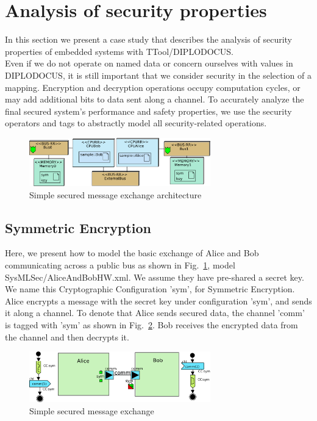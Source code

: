 \documentclass{llncs}
\begin{document}
\section{Analysis of security properties}
\label{sec:Security}
%
In this section we present a case study that describes the analysis of security properties of embedded systems with
TTool/DIPLODOCUS.\\
%

Even if we do not operate on named data or concern ourselves with values in DIPLODOCUS, it is still important that we
consider security in the selection of a mapping. Encryption and decryption
operations occupy computation cycles, or may add additional bits to data sent along a channel. To accurately analyze the final secured system's performance and safety
properties, we use the security operators and tags to abstractly model all security-related operations.


\begin{figure}[htbp]
	\centering
 	\includegraphics[width=0.7\textwidth]{figures/securityStuff/sampleArch.pdf}
	\caption{Simple secured message exchange architecture}
	\label{fig:sampleArch}
\end{figure}

\subsection{Symmetric Encryption}
\label{sec:symenc}

Here, we present how to model the basic exchange of Alice and Bob communicating
across a public bus as shown in Fig.~\ref{fig:sampleArch}, model SysMLSec/AliceAndBobHW.xml. We assume they have
pre-shared a secret key. We name this Cryptographic Configuration 'sym', for
Symmetric Encryption. Alice encrypts a message with the secret key under
configuration 'sym', and sends it along a channel. To denote that Alice sends
secured data, the channel 'comm' is tagged with 'sym' as shown in
Fig.~\ref{fig:sampleComp}.
Bob receives the encrypted data from the channel and then decrypts it.

\begin{figure}[htbp]
	\centering
 	\includegraphics[width=0.7\textwidth]{figures/securityStuff/sampleComp.pdf}
	\caption{Simple secured message exchange}
	\label{fig:sampleComp}
\end{figure}
\end{document}
